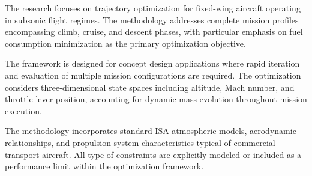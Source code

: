 
The research focuses on trajectory optimization for fixed-wing aircraft operating in subsonic flight regimes. The methodology addresses complete mission profiles encompassing climb, cruise, and descent phases, with particular emphasis on fuel consumption minimization as the primary optimization objective.

The framework is designed for concept design applications where rapid iteration and evaluation of multiple mission configurations are required. The optimization considers three-dimensional state spaces including altitude, Mach number, and throttle lever position, accounting for dynamic mass evolution throughout mission execution.

The methodology incorporates standard ISA atmospheric models, aerodynamic relationships, and propulsion system characteristics typical of commercial transport aircraft. All type of constraints are explicitly modeled or included as a performance limit within the optimization framework.
